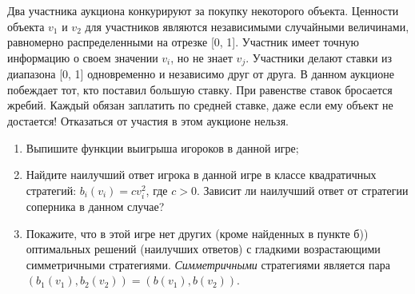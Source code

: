 \begin{comment}
Используя это и кососимметричность матрицы $A$, покажите
\[
M\left[ {\Phi \left( {t+1} \right)} \right]\le M\left[ {\Phi \left( t 
\right)} \right]\left( {1+{\varepsilon ^2} \mathord{\left/ {\vphantom 
{{\varepsilon ^2} 6}} \right. \kern-\nulldelimiterspace} 6} \right).
\]
Следовательно, $M\left[ {\Phi \left( t \right)} \right]\le n\exp \left( 
{{t\varepsilon ^2} \mathord{\left/ {\vphantom {{t\varepsilon ^2} 6}} \right. 
\kern-\nulldelimiterspace} 6} \right)$ и $M\left[ {\Phi \left( {t^\ast } 
\right)} \right]\le n^{5 \mathord{\left/ {\vphantom {5 3}} \right. 
\kern-\nulldelimiterspace} 3}$. Отсюда по неравенству Маркова имеем, что 
($n\ge 8)$
\[
P\left( {\Phi \left( {t^\ast } \right)\le n^2} \right)\ge P\left( {\Phi 
\left( {t^\ast } \right)\le 2n^{5 \mathord{\left/ {\vphantom {5 3}} \right. 
\kern-\nulldelimiterspace} 3}} \right)\ge 1 \mathord{\left/ {\vphantom {1 
2}} \right. \kern-\nulldelimiterspace} 2.
\]
Тогда $P\left( {{\varepsilon U_i \left( {t^\ast } \right)} \mathord{\left/ 
{\vphantom {{\varepsilon U_i \left( {t^\ast } \right)} 2}} \right. 
\kern-\nulldelimiterspace} 2\le 2\ln n,\;i=1,...,n} \right)\ge 1 
\mathord{\left/ {\vphantom {1 2}} \right. \kern-\nulldelimiterspace} 2$. 
Откуда уже следует, что $P\left( {\vec {x}\left( {t^\ast } \right)\le 
\varepsilon \vec {e}} \right)\ge 1 \mathord{\left/ {\vphantom {1 2}} \right. 
\kern-\nulldelimiterspace} 2$.
\end{problem}
 \end{comment}

\begin{problem}
Два участника аукциона конкурируют за покупку некоторого объекта. Ценности объекта    $v_1$ и $v_2$ для участников являются независимыми случайными величинами, равномерно распределенными на отрезке [0, 1]. Участник  имеет точную информацию о своем значении $v_i$, но не знает $v_j$. Участники делают ставки из диапазона [0, 1] одновременно и независимо друг от друга. В данном аукционе побеждает тот, кто поставил большую ставку. При равенстве ставок бросается жребий. Каждый обязан заплатить по средней ставке, даже если ему объект не достается! Отказаться от участия в этом аукционе нельзя.
\begin{enumerate}
\item Выпишите функции выигрыша игороков в данной игре;
\item Найдите наилучший ответ игрока в данной игре в классе квадратичных стратегий: $b_i(v_i) = cv_i^2$, где $c > 0$. Зависит ли наилучший ответ от стратегии соперника в данном случае?
\item Покажите, что в этой игре нет других (кроме найденных в пункте б)) оптимальных решений (наилучших ответов) с гладкими  возрастающими симметричными стратегиями. \textit{Симметричными} стратегиями является пара $(b_1(v_1), b_2(v_2)) = (b(v_1), b(v_2))$.
\end{enumerate}
\end{problem}

